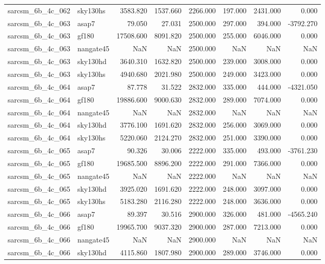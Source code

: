 \begin{tabular}{llrrrrrr}
sarcsm\_6b\_4c\_062 & sky130hs & 3583.820 & 1537.660 & 2266.000 & 197.000 & 2431.000 & 0.000 \\
sarcsm\_6b\_4c\_063 & asap7 & 79.050 & 27.031 & 2500.000 & 297.000 & 394.000 & -3792.270 \\
sarcsm\_6b\_4c\_063 & gf180 & 17508.600 & 8091.820 & 2500.000 & 255.000 & 6046.000 & 0.000 \\
sarcsm\_6b\_4c\_063 & nangate45 & NaN & NaN & 2500.000 & NaN & NaN & NaN \\
sarcsm\_6b\_4c\_063 & sky130hd & 3640.310 & 1632.820 & 2500.000 & 239.000 & 3008.000 & 0.000 \\
sarcsm\_6b\_4c\_063 & sky130hs & 4940.680 & 2021.980 & 2500.000 & 249.000 & 3423.000 & 0.000 \\
sarcsm\_6b\_4c\_064 & asap7 & 87.778 & 31.522 & 2832.000 & 335.000 & 444.000 & -4321.050 \\
sarcsm\_6b\_4c\_064 & gf180 & 19886.600 & 9000.630 & 2832.000 & 289.000 & 7074.000 & 0.000 \\
sarcsm\_6b\_4c\_064 & nangate45 & NaN & NaN & 2832.000 & NaN & NaN & NaN \\
sarcsm\_6b\_4c\_064 & sky130hd & 3776.100 & 1691.620 & 2832.000 & 256.000 & 3069.000 & 0.000 \\
sarcsm\_6b\_4c\_064 & sky130hs & 5220.060 & 2124.270 & 2832.000 & 251.000 & 3390.000 & 0.000 \\
sarcsm\_6b\_4c\_065 & asap7 & 90.326 & 30.006 & 2222.000 & 335.000 & 493.000 & -3761.230 \\
sarcsm\_6b\_4c\_065 & gf180 & 19685.500 & 8896.200 & 2222.000 & 291.000 & 7366.000 & 0.000 \\
sarcsm\_6b\_4c\_065 & nangate45 & NaN & NaN & 2222.000 & NaN & NaN & NaN \\
sarcsm\_6b\_4c\_065 & sky130hd & 3925.020 & 1691.620 & 2222.000 & 248.000 & 3097.000 & 0.000 \\
sarcsm\_6b\_4c\_065 & sky130hs & 5183.280 & 2116.280 & 2222.000 & 248.000 & 3636.000 & 0.000 \\
sarcsm\_6b\_4c\_066 & asap7 & 89.397 & 30.516 & 2900.000 & 326.000 & 481.000 & -4565.240 \\
sarcsm\_6b\_4c\_066 & gf180 & 19965.700 & 9037.320 & 2900.000 & 287.000 & 7213.000 & 0.000 \\
sarcsm\_6b\_4c\_066 & nangate45 & NaN & NaN & 2900.000 & NaN & NaN & NaN \\
sarcsm\_6b\_4c\_066 & sky130hd & 4115.860 & 1807.980 & 2900.000 & 289.000 & 3746.000 & 0.000 \\

\end{tabular}
